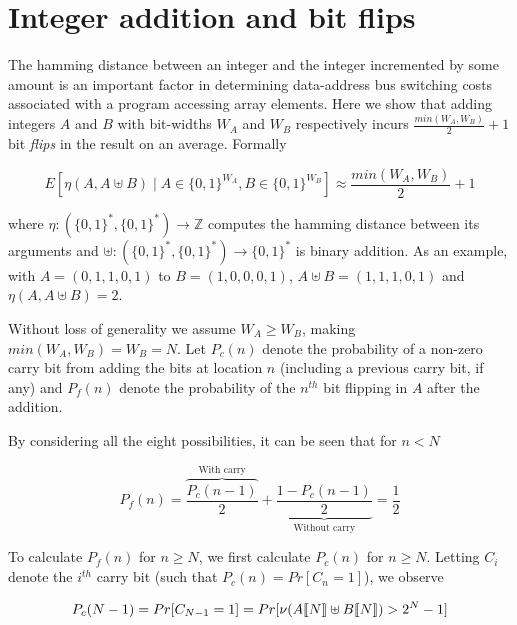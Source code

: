 \chapter{Integer addition and bit flips}

\label{AppendixC}


The hamming distance between an integer and the integer incremented by
some amount is an important factor in determining data-address bus
switching costs associated with a program accessing array elements.
Here we show that adding integers $A$ and $B$ with bit-widths $W_A$
and $W_B$ respectively incurs $\frac{min(W_A, W_B)}{2} + 1$ bit
\textit{flips} in the result on an average.  Formally

\begin{equation}
  \label{eq:master-flip}
  E[\eta(A, A \uplus B) \mid A \in \{0, 1\}^{W_A}, B \in \{0,
    1\}^{W_B} ] \approx \frac{min(W_A, W_B)}{2} + 1
\end{equation}

where $\eta : (\{0, 1\}^*, \{0, 1\}^*) \to \mathbb{Z}$ computes the
hamming distance between its arguments and $\uplus : (\{0, 1\}^*, \{0,
1\}^*) \to \{0, 1\}^*$ is binary addition.  As an example, with $A =
(0, 1, 1, 0, 1)$ to $B = (1, 0, 0, 0, 1)$, $A \uplus B = (1, 1, 1, 0,
1)$ and $\eta(A, A \uplus B) = 2$.

Without loss of generality we assume $W_A \geq W_B$, making $min(W_A,
W_B) = W_B = N$.  Let $P_c(n)$ denote the probability of a non-zero
carry bit from adding the bits at location $n$ (including a previous
carry bit, if any) and $P_f(n)$ denote the probability of the $n^{th}$
bit flipping in $A$ after the addition.

By considering all the eight possibilities, it can be seen that for $n
< N$

\begin{equation}
    P_f(n) = \overbrace{\frac{P_c(n - 1)}{2}}^{\text{With carry}} +
    \underbrace{\frac{1 - P_c(n - 1)}{2}}_{\text{Without carry}} = \frac{1}{2}
\end{equation}

To calculate $P_f(n)$ for $n \geq N$, we first calculate $P_c(n)$ for
$n \geq N$.  Letting $C_i$ denote the $i^{th}$ carry bit (such that
$P_c(n) = Pr[C_n = 1]$), we observe

\begin{equation}
  P_c(N - 1) = Pr[C_{N - 1} = 1] = Pr[\nu(A\llbracket N \rrbracket  \uplus
    B\llbracket N \rrbracket ) > 2^N - 1]
\end{equation}

